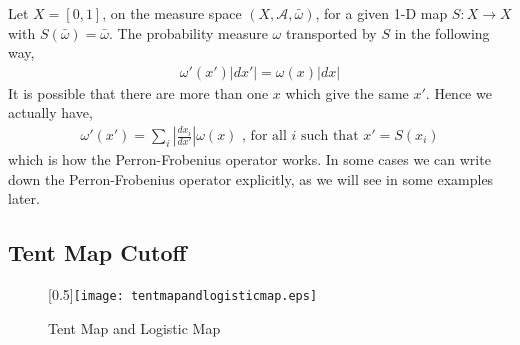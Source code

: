 Let $X = [0,1]$, on the measure space  $(X,\mathcal{A},\bar{\omega})$, for a given 1-D map $S: X \rightarrow X $ with $S(\bar{\omega})=\bar{\omega}$. The probability measure $\omega$  transported by $S$ in the following way, 
  \begin{eqnarray}
    \omega'(x')|dx'| = \omega(x)|dx|
  \end{eqnarray}
It is possible that there are more than one $x$ which give the same $x'$. Hence we actually have,
  \begin{eqnarray}
  \label{omegamap}
    \omega'(x') = \sum_i \left|\frac{dx_i}{dx'}\right|\omega(x) \mbox{   , for all } i \mbox{  such that  } x'=S(x_i)
  \end{eqnarray}
which is how the Perron-Frobenius operator works. In some cases we can write down the Perron-Frobenius operator explicitly, as we will see in some examples later. 


\subsection{Tent Map Cutoff}

\begin{figure}
\caption{\label{tentmapandlogisticmap} Tent Map and Logistic Map }
\centerline{\scalebox{0.5}[0.5]{\texttt{[image: tentmapandlogisticmap.eps]}}}
\end{figure}


